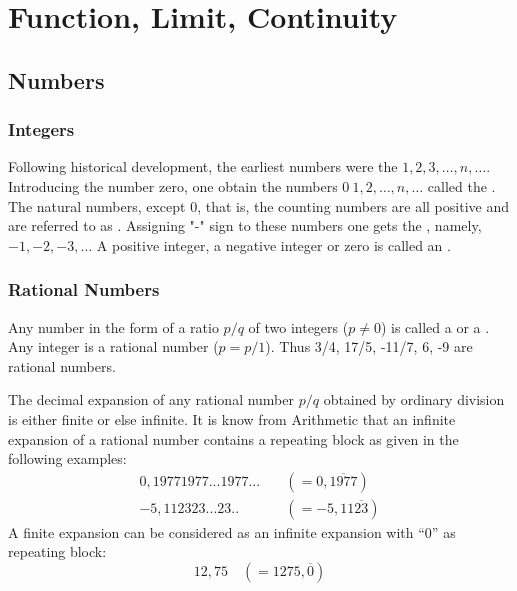 \documentclass[11pt]{amsbook}
\begin{document}
\chapter{Function, Limit, Continuity}
\label{chap:FuncLimCont}




\section{Numbers}
\label{sec:Numbers}




\subsection{Integers}
\label{subsec:Integers}

Following historical development, the earliest numbers were the 
$1, 2, 3, \dotsc, n, \dotsc$. 
Introducing the number zero, one obtain the numbers 
$0\ 1, 2, \dotsc, n, \dotsc$ 
called the 
. 
The natural numbers, except 0, that is, the counting numbers are all positive and are referred to as 
. 
Assigning "-" sign to these numbers one gets the 
, namely, 
$-1, -2, -3, \dotsc$
A positive integer, a negative integer or zero is called an 
.




\subsection{Rational Numbers}
\label{subsec:RationalNumbers}

Any number in the form of a ratio $p/q$ of two integers 
($p \ne 0$) is called a 
 or a 
.
Any integer is a rational number ($p=p/1$). 
Thus 3/4, 17/5, -11/7, 6, -9 are rational numbers.

The decimal expansion of any rational number $p/q$ obtained by ordinary division is either finite or else infinite. It is know from Arithmetic that an infinite expansion of a rational number contains a repeating block as given in the following examples:
\begin{align*}
	0,19771977...1977...  \quad &(= 0,\overline{1977}) \\
	-5,112323...23.. \quad &(= -5,11\overline{23})
\end{align*}
A finite expansion can be considered as 
an infinite expansion with ``0'' as repeating block:
\[
	12,75 \quad (= 1275,\overline{0}) 
\]
\end{document}
